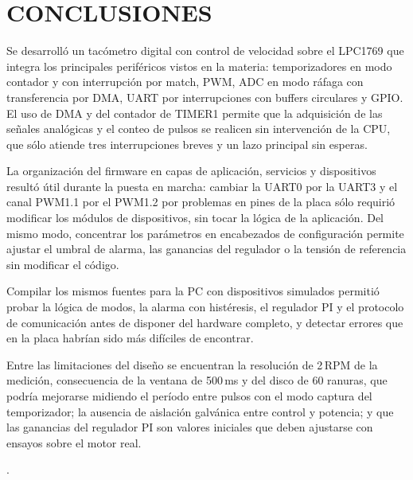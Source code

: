 \section{CONCLUSIONES}

Se desarrolló un tacómetro digital con control de velocidad sobre el LPC1769 que integra
los principales periféricos vistos en la materia: temporizadores en modo contador y con
interrupción por match, PWM, ADC en modo ráfaga con transferencia por DMA, UART por
interrupciones con buffers circulares y GPIO. El uso de DMA y del contador de TIMER1
permite que la adquisición de las señales analógicas y el conteo de pulsos se realicen sin
intervención de la CPU, que sólo atiende tres interrupciones breves y un lazo principal
sin esperas.

La organización del firmware en capas de aplicación, servicios y dispositivos resultó útil
durante la puesta en marcha: cambiar la UART0 por la UART3 y el canal PWM1.1 por el PWM1.2
por problemas en pines de la placa sólo requirió modificar los módulos de dispositivos,
sin tocar la lógica de la aplicación. Del mismo modo, concentrar los parámetros en
encabezados de configuración permite ajustar el umbral de alarma, las ganancias del
regulador o la tensión de referencia sin modificar el código.

Compilar los mismos fuentes para la PC con dispositivos simulados permitió probar la
lógica de modos, la alarma con histéresis, el regulador PI y el protocolo de comunicación
antes de disponer del hardware completo, y detectar errores que en la placa habrían sido
más difíciles de encontrar.

Entre las limitaciones del diseño se encuentran la resolución de 2\,RPM de la medición,
consecuencia de la ventana de 500\,ms y del disco de 60 ranuras, que podría mejorarse
midiendo el período entre pulsos con el modo captura del temporizador; la ausencia de
aislación galvánica entre control y potencia; y que las ganancias del regulador PI son
valores iniciales que deben ajustarse con ensayos sobre el motor real.

.
